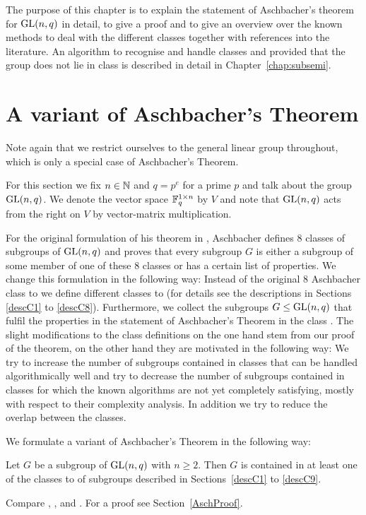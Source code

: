 The purpose of this chapter is to explain the statement of Aschbacher's 
theorem for $\GL(n,q)$ in detail, to give a proof and to give an
overview over the known methods to deal with the different classes
together with references into the literature. An algorithm to recognise
and handle classes  and  provided that the group does not lie in
class  is described in detail in Chapter~\ref{chap:subsemi}.

\section{A variant of Aschbacher's Theorem}
\label{sect:aschbacher}

Note again that we restrict ourselves to the general linear group
throughout, which is only a special case of Aschbacher's Theorem.

\begin{Not}
For this section we fix $n \in \mathbb{N}$ and $q=p^e$ for a prime $p$ and
talk about the group $\GL(n,q)$. We denote the vector space $\mathbb{F}_q^{1
\times n}$ by $V$ and note that $\GL(n,q)$ acts from the right on $V$ by
vector-matrix multiplication.
\end{Not}

For the original formulation of his theorem in \cite{aschbacher}, Aschbacher 
defines $8$ classes
of subgroups of $\GL(n,q)$ and proves that every subgroup $G$ is either
a subgroup of some member of one of these $8$ classes or has a certain
list of properties. We change this formulation in the following
way: Instead of the original 8 Aschbacher class  to 
we define different classes  to 
(for details see the descriptions in Sections \ref{descC1} to
\ref{descC8}).
Furthermore, we collect
the subgroups $G \le \GL(n,q)$ that fulfil the properties in the statement of 
Aschbacher's Theorem in the class . The slight modifications 
to the class definitions on the one hand stem from our proof of the
theorem, on the other hand they are motivated in the following way: We try
to increase the number of subgroups contained in classes that can be
handled algorithmically well and try to decrease the number of subgroups
contained in classes for which the known algorithms are not yet completely
satisfying, mostly with respect to their complexity analysis.
In addition we try to reduce the overlap between the classes.

We formulate a variant of Aschbacher's Theorem in the following way:

\begin{Theo}
\label{Asch}
Let $G$ be a subgroup of\/ $\GL(n,q)$ with $n \ge 2$.
Then $G$ is contained in at least one of the
classes  to  of subgroups described in Sections~\ref{descC1}
to \ref{descC9}.
\end{Theo}
\proofbeg Compare \cite[Appendix 2, Theorem 1]{RobPhd}, \cite{aschbacher}, 
\cite{kleilieb} and 
\cite[Theorem~1]{smashprim}. For a proof see Section~\ref{AschProof}.
\proofend

